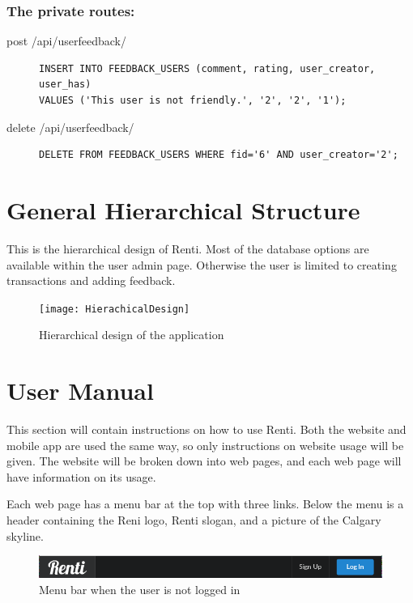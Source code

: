 \documentclass{article}
\begin{document}
\subsubsection{The private routes:}
\begin{description}
\item[post /api/userfeedback/] \mbox{}
\begin{lstlisting}[style=sql]
INSERT INTO FEEDBACK_USERS (comment, rating, user_creator, user_has)
VALUES ('This user is not friendly.', '2', '2', '1');
\end{lstlisting}
\item[delete /api/userfeedback/] \mbox{}
\begin{lstlisting}[style=sql]
DELETE FROM FEEDBACK_USERS WHERE fid='6' AND user_creator='2';
\end{lstlisting}
\end{description}

\section{General Hierarchical Structure}
This is the hierarchical design of Renti. Most of the database options are available within the user admin page. Otherwise the user is limited to creating transactions and adding feedback.
\begin{figure}[ht!]
    \centering
    \texttt{[image: HierachicalDesign]}
    \caption{Hierarchical design of the application}
    \label{fig:hierachDesign}
\end{figure}

\section{User Manual}
This section will contain instructions on how to use Renti. Both the website and mobile app are used the same way, so only instructions on website usage will be given. The website will be broken down into web pages, and each web page will have information on its usage.

Each web page has a menu bar at the top with three links. Below the menu is a header containing the Reni logo, Renti slogan, and a picture of the Calgary skyline.
\begin{figure}[ht!]
    \centering
    \includegraphics[keepaspectratio, width=\textwidth]{menubarloggedout}
    \caption{Menu bar when the user is not logged in}
    \label{fig:menubarloggedout}
\end{figure}
\end{document}
